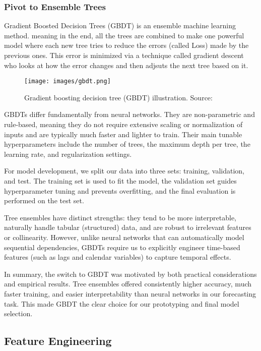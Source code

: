 \subsubsection*{Pivot to Ensemble Trees}  
Gradient Boosted Decision Trees (GBDT) is an ensemble machine learning method. meaning in the 
end, all the trees are combined to make one powerful model where each new tree tries to reduce 
the errors (called Loss) made by the previous ones. This error is minimized via a technique called
gradient descent who looks at how the error changes and then adjsuts the next tree based on it.

\begin{figure}[h!]
\centering
\texttt{[image: images/gbdt.png]}
\caption{Gradient boosting decision tree (GBDT) illustration. Source: \cite{SaniAbba2022}}
\label{fig:gbdt-illustration}
\end{figure}

GBDTs differ fundamentally from neural networks. They are non-parametric and rule-based, 
meaning they do not require extensive scaling or normalization of inputs and are typically 
much faster and lighter to train. Their main tunable hyperparameters include the number of 
trees, the maximum depth per tree, the learning rate, and regularization settings.

For model development, we split our data into three sets: training, validation, and test. 
The training set is used to fit the model, the validation set guides hyperparameter tuning 
and prevents overfitting, and the final evaluation is performed on the test set.

Tree ensembles have distinct strengths: they tend to be more interpretable, naturally 
handle tabular (structured) data, and are robust to irrelevant features or collinearity. 
However, unlike neural networks that can automatically model sequential dependencies, 
GBDTs require us to explicitly engineer time-based features (such as lags and calendar 
variables) to capture temporal effects.

In summary, the switch to GBDT was motivated by both practical considerations and 
empirical results. Tree ensembles offered consistently higher accuracy, much faster 
training, and easier interpretability than neural networks in our forecasting task. 
This made GBDT the clear choice for our prototyping and final model selection.

\subsection{Feature Engineering}

